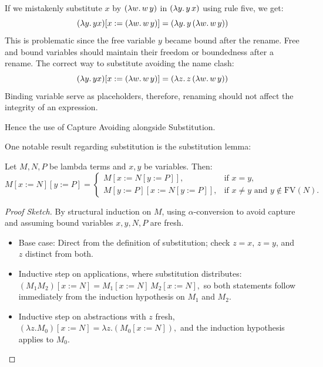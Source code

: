 \begin{example} If we mistakenly substitute $x$ by \( (\lambda w . \, w \, y) \) in \( (\lambda y . \, y \, x ) \) using rule five, we get:
  \[
    (\lambda y . \, y x) [x := (\lambda w . \, w \, y)] = (\lambda y . \, y \, (\lambda w. \, w \, y))
  \]
  This is problematic since the free variable $y$ became bound after the rename. Free and bound variables should maintain their freedom or boundedness after a rename. The correct way to substitute avoiding the name clash:
  \[
    (\lambda y . \, y x) [x := (\lambda w . \, w \, y)] = (\lambda z . \, z \, (\lambda w. \, w \, y))
  \]
  Binding variable serve as placeholders, therefore, renaming should not affect the integrity of an expression.
\end{example}

\begin{note}
  Hence the use of Capture Avoiding alongside Substitution.
\end{note}


One notable result regarding substitution is the substitution lemma:

\begin{lemma} Let \(M, N, P\) be lambda terms and \(x, y\) be variables. Then:
\[
M[x := N][y := P] =
\begin{cases}
M[x := N[y := P]], & \text{if } x = y, \\
M[y := P][x := N[y := P]], & \text{if } x \neq y \text{ and } y \notin \mathrm{FV}(N).
\end{cases}
\]
\end{lemma}

\begin{proof}[Proof Sketch]
  By structural induction on $M$, using $\alpha$-conversion to avoid capture and
assuming bound variables $x,y,N,P$ are fresh.

\begin{itemize}
\item Base case: Direct from the definition of substitution; check $z = x$,
$z = y$, and $z$ distinct from both.
\item Inductive step on applications, where substitution distributes:
\(
(M_1M_2)[x:=N] = M_1[x:=N]\,M_2[x:=N],
\)
so both statements follow immediately from the induction hypothesis on $M_1$ and $M_2$.
\item Inductive step on abstractions with $z$ fresh,
\(
(\lambda z.M_0)[x:=N] = \lambda z.(M_0[x:=N]),
\)
and the induction hypothesis applies to $M_0$.
\end{itemize}
\end{proof}

